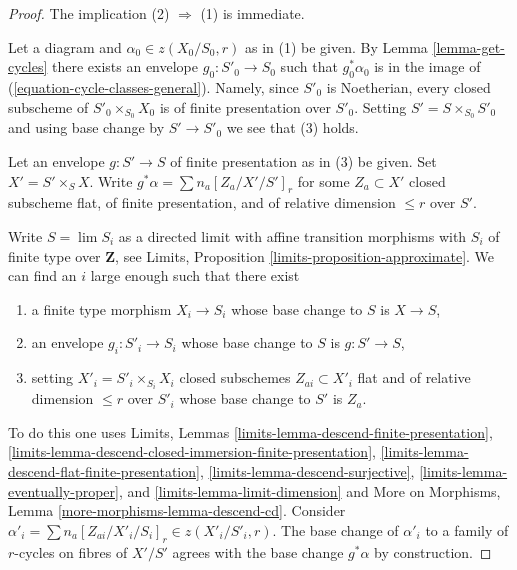 \begin{proof}
The implication (2) $\Rightarrow$ (1) is immediate.

\medskip\noindent
Let a diagram and $\alpha_0 \in z(X_0/S_0, r)$ as in (1) be given.
By Lemma \ref{lemma-get-cycles} there exists an envelope
$g_0 : S'_0 \to S_0$ such that $g_0^*\alpha_0$ is in
the image of (\ref{equation-cycle-classes-general}). Namely, since
$S'_0$ is Noetherian, every closed subscheme of $S'_0 \times_{S_0} X_0$
is of finite presentation over $S'_0$. Setting $S' = S \times_{S_0} S'_0$
and using base change by $S' \to S'_0$ we see that (3) holds.

\medskip\noindent
Let an envelope $g : S' \to S$ of finite presentation as in (3) be given.
Set $X' = S' \times_S X$. Write $g^*\alpha = \sum n_a [Z_a/X'/S']_r$
for some $Z_a \subset X'$ closed subscheme flat, of finite presentation,
and of relative dimension $\leq r$ over $S'$.

\medskip\noindent
Write $S = \lim S_i$ as a directed limit with affine transition
morphisms with $S_i$ of finite type over $\mathbf{Z}$,
see Limits, Proposition \ref{limits-proposition-approximate}.
We can find an $i$ large enough such that there exist
\begin{enumerate}
\item a finite type morphism $X_i \to S_i$ whose base change to $S$
is $X \to S$,
\item an envelope $g_i : S'_i \to S_i$ whose base change to $S$ is
$g : S' \to S$,
\item setting $X'_i = S'_i \times_{S_i} X_i$
closed subschemes $Z_{ai} \subset X'_i$ flat and of
relative dimension $\leq r$ over $S'_i$ whose base change to $S'$
is $Z_a$.
\end{enumerate}
To do this one uses Limits, Lemmas
\ref{limits-lemma-descend-finite-presentation},
\ref{limits-lemma-descend-closed-immersion-finite-presentation},
\ref{limits-lemma-descend-flat-finite-presentation},
\ref{limits-lemma-descend-surjective},
\ref{limits-lemma-eventually-proper}, and
\ref{limits-lemma-limit-dimension}
and More on Morphisms, Lemma
\ref{more-morphisms-lemma-descend-cd}.
Consider $\alpha'_i = \sum n_a [Z_{ai}/X'_i/S_i]_r \in z(X'_i/S'_i, r)$.
The base change of $\alpha'_i$ to a family of $r$-cycles on fibres
of $X'/S'$ agrees with the base change $g^*\alpha$ by construction.


\end{proof}
